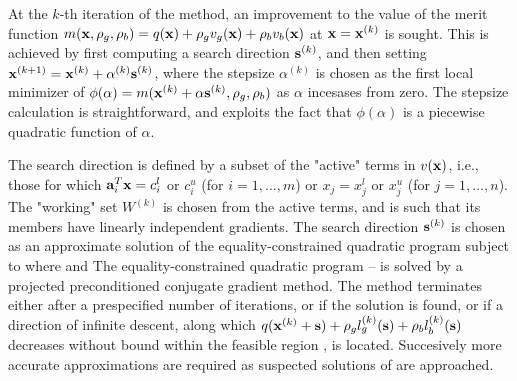 \documentclass{galahad}
\begin{document}

\galmethod
At the $k$-th iteration of the method, an improvement to the value
of the merit function 
$m({\mathbf{x}}, \rho_g, \rho_b ) = q({\mathbf{x}}) + \rho_g v_g({\mathbf{x}}) + \rho_b v_b({\mathbf{x}})$
at ${\mathbf{x}} = {\mathbf{x}}^{(k)}$ is sought. This is achieved by first 
computing a search direction ${\mathbf{s}}^{(k)}$,
and then setting ${\mathbf{x}}^{(k+1)} = {\mathbf{x}}^{(k)} + \alpha^{(k)} {\mathbf{s}}^{(k)}$,
where the stepsize $\alpha^{(k)}$ is chosen as the first local minimizer of 
$\phi ( \alpha ) = m( {\mathbf{x}}^{(k)} + \alpha {\mathbf{s}}^{(k)} , \rho_g, \rho_b )$
as $\alpha$ incesases from zero. 
The stepsize calculation is straightforward, and exploits the fact that
$\phi ( \alpha )$ is a piecewise quadratic function of $\alpha$.

The search direction is defined by a subset of the "active" terms in 
$v({\mathbf{x}})$, i.e., those for which 
${\mathbf{a}}_i^T {\mathbf{x}} = c_i^l$ or $c_i^u$ (for $i=1,\ldots ,m$) or 
$x_j = x_j^l$ or $x_j^u$ (for $j=1,\ldots ,n$).
The "working" set $W^{(k)}$ is chosen from the active terms, and is such 
that its members have linearly independent gradients. 
The search direction ${\mathbf{s}}^{(k)}$ is chosen as an approximate solution of 
the equality-constrained quadratic program
subject to 
where
and
The equality-constrained quadratic program -- is solved by
a projected preconditioned conjugate gradient method. The method terminates
either after a prespecified number of iterations, or if the solution is found,
or if a direction of infinite descent, along which 
$q({\mathbf{x}}^{(k)} + {\mathbf{s}}) + \rho_g l_g^{(k)} ({\mathbf{s}}) + \rho_b l_b^{(k)} ({\mathbf{s}})$
decreases without bound within the feasible region , is located. 
Succesively more accurate approximations are required as suspected 
solutions of  are approached.
\end{document}
